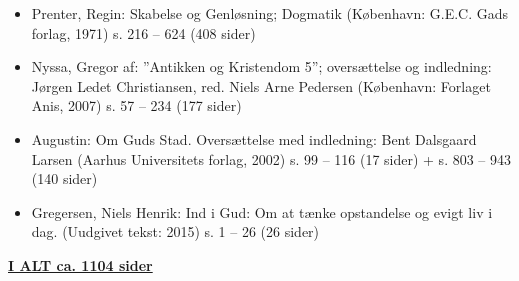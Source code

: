\begin{itemize}
\item Prenter, Regin: Skabelse og Genløsning; Dogmatik (København: G.E.C. Gads forlag, 1971) s. 216 – 624 (408 sider) 
\item Nyssa, Gregor af: ”Antikken og Kristendom 5”; oversættelse og indledning: Jørgen Ledet Christiansen, red. Niels Arne Pedersen (København: Forlaget Anis, 2007) s. 57 – 234 (177 sider)  
\item Augustin: Om Guds Stad.  Oversættelse med indledning: Bent Dalsgaard Larsen (Aarhus Universitets forlag, 2002) s. 99 – 116 (17 sider) + s. 803 – 943 (140 sider)
\item Gregersen, Niels Henrik: Ind i Gud: Om at tænke opstandelse og evigt liv i dag. (Uudgivet tekst: 2015) s. 1 – 26 (26 sider)
\end{itemize}

\textbf{\underline{\large I ALT ca. 1104 sider}}